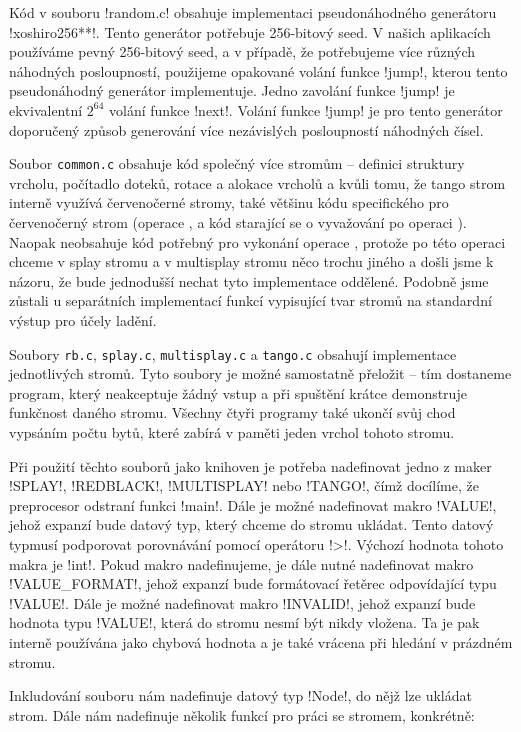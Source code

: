 Kód v souboru !random.c! obsahuje implementaci pseudonáhodného generátoru
!xoshiro256**!. Tento generátor potřebuje 256-bitový seed. V našich aplikacích
používáme pevný 256-bitový seed, a v případě, že potřebujeme více různých
náhodných posloupností, použijeme opakované volání funkce !jump!, kterou tento
pseudonáhodný generátor implementuje. Jedno zavolání funkce !jump! je
ekvivalentní $2^{64}$ volání funkce !next!. Volání funkce !jump! je pro tento
generátor doporučený způsob generování více nezávislých posloupností náhodných
čísel.

Soubor {\tt common.c} obsahuje kód společný více
stromům -- definici struktury vrcholu, počítadlo doteků, rotace a alokace vrcholů a kvůli
tomu, že tango strom interně využívá červenočerné stromy, také většinu kódu
specifického pro červenočerný strom (operace ,  a kód
starající se o vyvažování po operaci ). Naopak neobsahuje kód
potřebný pro vykonání operace , protože po této operaci chceme v
splay stromu a v multisplay stromu něco trochu jiného a došli jsme k názoru, že
bude jednodušší nechat tyto implementace oddělené. Podobně jsme zůstali u
separátních implementací funkcí vypisující tvar stromů na standardní výstup pro
účely ladění.

Soubory {\tt rb.c}, {\tt splay.c}, {\tt multisplay.c} a {\tt tango.c} obsahují
implementace jednotlivých stromů. Tyto soubory je možné samostatně přeložit --
tím dostaneme program, který neakceptuje žádný vstup a při spuštění krátce
demonstruje funkčnost daného stromu. Všechny čtyři programy také ukončí svůj
chod vypsáním počtu bytů, které zabírá v paměti jeden vrchol tohoto stromu.

Při použití těchto souborů jako knihoven je potřeba nadefinovat jedno z maker
!SPLAY!, !REDBLACK!, !MULTISPLAY! nebo !TANGO!, čímž docílíme, že preprocesor
odstraní funkci !main!. Dále je možné nadefinovat makro !VALUE!, jehož expanzí
bude datový typ, který chceme do stromu ukládat. Tento datový typmusí
podporovat porovnávání pomocí operátoru !>!. Výchozí hodnota tohoto makra je
!int!. Pokud makro nadefinujeme, je dále nutné nadefinovat makro
!VALUE_FORMAT!, jehož expanzí bude formátovací řetěrec odpovídající typu
!VALUE!. Dále je možné nadefinovat makro !INVALID!, jehož expanzí bude hodnota
typu !VALUE!, která do stromu nesmí být nikdy vložena. Ta je pak interně
používána jako chybová hodnota a je také vrácena při hledání v prázdném stromu.

Inkludování souboru nám nadefinuje datový typ !Node!, do nějž lze ukládat strom. Dále nám nadefinuje několik funkcí pro práci se stromem, konkrétně:

